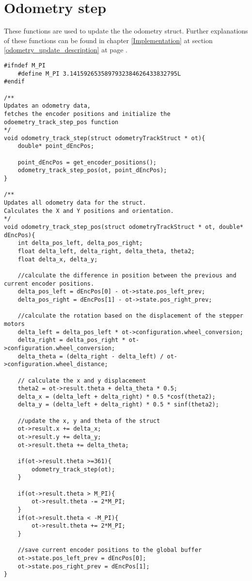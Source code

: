 \section{Odometry step}
\label{odometry_update_code}
These functions are used to update the the odometry struct.
Further explanations of these functions can be found in chapter \ref{Implementation} at section \ref{odometry_update_description} at page \pageref{odometry_update_description}.
\begin{lstlisting}[caption = {Updating odometry struct}]
#ifndef M_PI
	#define M_PI 3.1415926535897932384626433832795L
#endif

/**
Updates an odometry data,
fetches the encoder positions and initialize the 
odoemetry_track_step_pos function
*/
void odometry_track_step(struct odometryTrackStruct * ot){
	double* point_dEncPos;
	
	point_dEncPos = get_encoder_positions();
	odometry_track_step_pos(ot,	point_dEncPos);
}

/**
Updates all odometry data for the struct.
Calculates the X and Y positions and orientation. 
*/
void odometry_track_step_pos(struct odometryTrackStruct * ot, double* dEncPos){
	int delta_pos_left, delta_pos_right;
	float delta_left, delta_right, delta_theta, theta2;
	float delta_x, delta_y;
	
	//calculate the difference in position between the previous and current encoder positions. 
	delta_pos_left = dEncPos[0] - ot->state.pos_left_prev;
	delta_pos_right = dEncPos[1] - ot->state.pos_right_prev;
	
	//calculate the rotation based on the displacement of the stepper motors 
	delta_left = delta_pos_left * ot->configuration.wheel_conversion;
	delta_right = delta_pos_right * ot->configuration.wheel_conversion;
	delta_theta = (delta_right - delta_left) / ot->configuration.wheel_distance;
	
	// calculate the x and y displacement 
	theta2 = ot->result.theta + delta_theta * 0.5;
	delta_x = (delta_left + delta_right) * 0.5 *cosf(theta2); 
	delta_y = (delta_left + delta_right) * 0.5 * sinf(theta2);
	
	//update the x, y and theta of the struct
	ot->result.x += delta_x;
	ot->result.y += delta_y;
	ot->result.theta += delta_theta;

	if(ot->result.theta >=361){
		odometry_track_step(ot);
	}
	
	if(ot->result.theta > M_PI){
		ot->result.theta -= 2*M_PI;
	}
	if(ot->result.theta < -M_PI){
		ot->result.theta += 2*M_PI;
	}
	
	//save current encoder positions to the global buffer 
	ot->state.pos_left_prev = dEncPos[0];
	ot->state.pos_right_prev = dEncPos[1]; 
}
\end{lstlisting}


